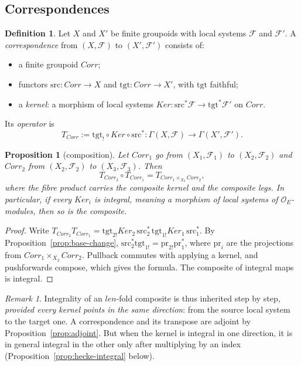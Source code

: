 \documentclass[11pt]{amsart}
\newtheorem{proposition}[theorem]{Proposition}
\theoremstyle{definition}
\newtheorem{definition}[theorem]{Definition}
\theoremstyle{remark}
\newtheorem{remark}[theorem]{Remark}
\newcommand{\OEring}{\mathcal{O}_E}
\newcommand{\len}{\mathit{len}}
\newcommand{\Corr}{\mathit{Corr}}
\newcommand{\Ker}{\mathit{Ker}}
\newcommand{\src}{\mathrm{src}}
\newcommand{\tgt}{\mathrm{tgt}}
\begin{document}
\subsection{Correspondences}
\begin{definition}\label{def:correspondence}
Let $X$ and $X'$ be finite groupoids with local systems $\mathcal F$ and $\mathcal F'$. A \emph{correspondence} from $(X,\mathcal F)$ to $(X',\mathcal F')$ consists of:
\begin{itemize}
\item a finite groupoid $\Corr$;
\item functors $\src\colon\Corr\to X$ and $\tgt\colon\Corr\to X'$, with $\tgt$ faithful;
\item a \emph{kernel}: a morphism of local systems $\Ker\colon\src^*\mathcal F\to\tgt^*\mathcal F'$ on $\Corr$.
\end{itemize}
Its \emph{operator} is
\[
T_{\Corr}:=\tgt_!\circ\Ker\circ\src^*\colon\Gamma(X,\mathcal F)\to\Gamma(X',\mathcal F').
\]
\end{definition}

\begin{proposition}[composition]\label{prop:composition}
Let $\Corr_1$ go from $(X_1,\mathcal F_1)$ to $(X_2,\mathcal F_2)$ and $\Corr_2$ from $(X_2,\mathcal F_2)$ to $(X_3,\mathcal F_3)$. Then
\[
T_{\Corr_2}\circ T_{\Corr_1}=T_{\Corr_1\times_{X_2}\Corr_2},
\]
where the fibre product carries the composite kernel and the composite legs. In particular, if every $\Ker_i$ is integral, meaning a morphism of local systems of $\OEring$-modules, then so is the composite.
\end{proposition}

\begin{proof}
Write $T_{\Corr_2}T_{\Corr_1}=\tgt_{2!}\Ker_2\,\src_2^*\,\tgt_{1!}\Ker_1\,\src_1^*$. By Proposition~\ref{prop:base-change}, $\src_2^*\tgt_{1!}=\mathrm{pr}_{2!}\mathrm{pr}_1^*$, where $\mathrm{pr}_i$ are the projections from $\Corr_1\times_{X_2}\Corr_2$. Pullback commutes with applying a kernel, and pushforwards compose, which gives the formula. The composite of integral maps is integral.
\end{proof}

\begin{remark}
Integrality of an $\len$-fold composite is thus inherited step by step, \emph{provided every kernel points in the same direction}: from the source local system to the target one. A correspondence and its transpose are adjoint by Proposition~\ref{prop:adjoint}. But when the kernel is integral in one direction, it is in general integral in the other only after multiplying by an index (Proposition~\ref{prop:hecke-integral} below).
\end{remark}
\end{document}

